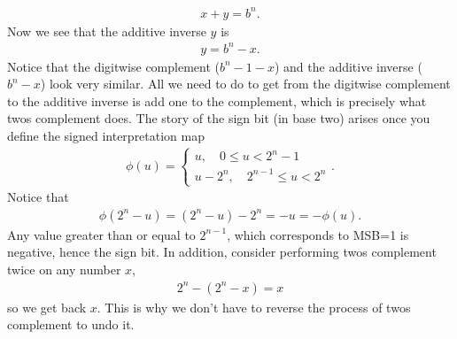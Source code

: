 \documentclass{report}
\begin{document}
\begin{itemize}
            \begin{align*}
                x+y = b^{n}
            .\end{align*}
            Now we see that the additive inverse $y$ is 
            \begin{align*}
                y = b^{n} - x 
            .\end{align*}
            Notice that the digitwise complement ($b^{n}-1-x$) and the additive inverse ($b^{n}-x$) look very similar. All we need to do to get from the digitwise complement to the additive inverse is add one to the complement, which is precisely what twos complement does.
            \bigbreak \noindent 
            The story of the sign bit (in base two) arises once you define the signed interpretation map
            \begin{align*}
                \phi(u) = \begin{cases}
                    u, \quad 0 \leq u < 2^{n}-1     \\
                    u-2^{n}, \quad 2^{n-1} \leq u < 2^{n}
                \end{cases}
            .\end{align*}
            Notice that 
            \begin{align*}
                \phi(2^{n}-u) = (2^{n}-u)-2^{n} = -u = -\phi(u)
            .\end{align*}
            Any value greater than or equal to $2^{n-1}$, which corresponds to MSB=1 is negative, hence the sign bit.
            \bigbreak \noindent 
            In addition, consider performing twos complement twice on any number $x$,
            \begin{align*}
                2^{n}-(2^{n}-x) = x
            \end{align*}
            so we get back $x$. This is why we don't have to reverse the process of twos complement to undo it.


\end{itemize}
\end{document}
